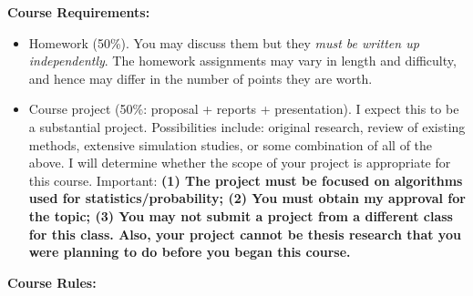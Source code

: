 \documentclass[10pt]{article}
\begin{document}
\noindent 
{\bf Course Requirements:}
\begin{itemize}
\item Homework (50\%). You may discuss them but they {\it must be written
  up independently}. The homework assignments may vary in length and
  difficulty, and hence may differ in the number of points they are worth.
\item Course project (50\%: proposal + reports + presentation). I
  expect this to be a substantial project. Possibilities include:
  original research, review of existing methods, extensive simulation
  studies, or some combination of all of the above. I will determine
  whether the scope of your project is appropriate for this
  course. Important: {\bf (1) The project must be focused on
    algorithms used for statistics/probability; (2) You must obtain my
    approval for the topic; (3) You may not submit a project from a
    different class for this class. Also, your project cannot be
    thesis research that you were planning to do before you began this
    course.}
\end{itemize} 
{\bf Course Rules:}
\end{document}
